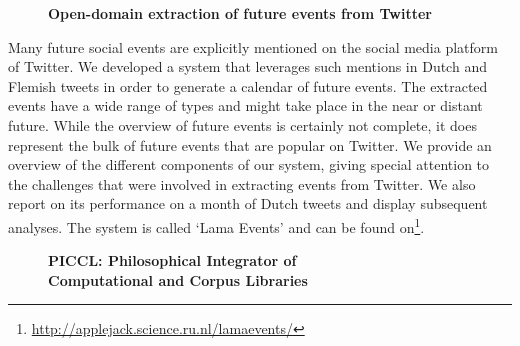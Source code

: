 \documentclass[10pt, a4paper, twopage, headinclude, footinclude, BCOR5mm]{book}
\begin{document}
\newpage

\begin{figure}[t!]
\centering
\large\textbf{Open-domain extraction of future events from Twitter}
\vspace*{0.5cm}
\end{figure}


\begin{table}[t!]
\end{table} 
\noindent
Many future social events are explicitly mentioned on the social media platform of Twitter. We developed a system that leverages such mentions in Dutch and Flemish tweets in order to generate a calendar of future events. The extracted events have a wide range of types and might take place in the near or distant future. While the overview of future events is certainly not complete, it does represent the bulk of future events that are popular on Twitter.   We provide an overview of the different components of our system, giving special attention to the challenges that were involved in extracting events from Twitter. We also report on its performance on a month of Dutch tweets and display subsequent analyses. The system is called `Lama Events' and can be found on\footnote{\url{ http://applejack.science.ru.nl/lamaevents/}}.   

\newpage

\begin{figure}[t!]
\centering
\large\textbf{PICCL: Philosophical Integrator of \\ Computational and Corpus Libraries}
\vspace*{0.5cm}
\end{figure}
\end{document}
